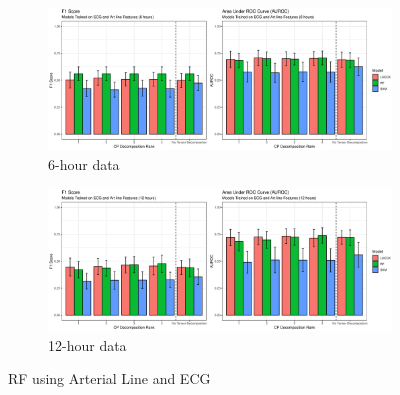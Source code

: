 \begin{figure}[htb]
    \centering
    \begin{subfigure}[htb]{\textwidth}
        \includegraphics[width=\textwidth]{body/figures/both_6.eps}
        \caption{6-hour data}
    \end{subfigure}
    \hfill
    \begin{subfigure}[htb]{\textwidth}
        \includegraphics[width=\textwidth]{body/figures/both_12.eps}
        \caption{12-hour data}
    \end{subfigure}
    \caption{RF using Arterial Line and ECG}
    \label{fig:sigonly}
\end{figure}  %

